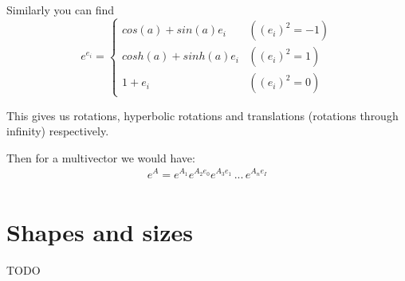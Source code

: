 \documentclass[twoside]{article}
\newcommand{\B}[1]{\left(#1\right)} %
\begin{document}
\begin{multicols*}{2}
$$\begin{aligned}
                \end{aligned}$$
            \par
                Similarly you can find
                $$ e^{e_i} = \begin{cases}
                    cos(a) + sin(a) e_i & (\B{e_i}^2 = -1) \\
                    cosh(a) + sinh(a) e_i & (\B{e_i}^2 = 1) \\
                    1 + e_i & (\B{e_i}^2 = 0)
                    \end{cases}$$
            \par
                This gives us rotations, hyperbolic rotations and translations (rotations through infinity) respectively.
            \par
                Then for a multivector we would have:
                \begin{gather*}
                    e^A = e^{A_1} e^{A_2 e_0} e^{A_3 e_1} \, ... \, e^{A_n e_I} \\
                \end{gather*}
        \section{Shapes and sizes}
            \par
                TODO
    \end{multicols*}
\end{document}
